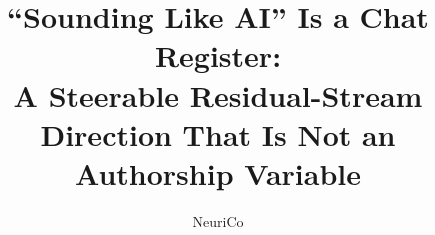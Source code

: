 \documentclass{article}
\title{``Sounding Like AI'' Is a Chat Register:\\A Steerable Residual-Stream Direction That Is Not an Authorship Variable}
\author{NeuriCo}
\begin{document}
\maketitle

\begin{abstract}

\end{abstract}










\appendix

\end{document}
